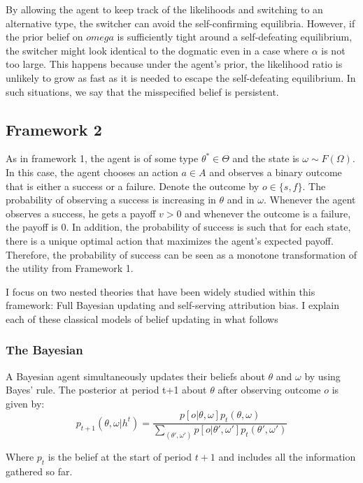 \documentclass[
  12pt,
]{article}
\begin{document}
By allowing the agent to keep track of the likelihoods and switching to
an alternative type, the switcher can avoid the self-confirming
equilibria. However, if the prior belief on \(omega\) is sufficiently
tight around a self-defeating equilibrium, the switcher might look
identical to the dogmatic even in a case where \(\alpha\) is not too
large. This happens because under the agent's prior, the likelihood
ratio is unlikely to grow as fast as it is needed to escape the
self-defeating equilibrium. In such situations, we say that the
misspecified belief is persistent.

\hypertarget{framework-2}{%
\subsection{Framework 2}\label{framework-2}}

As in framework 1, the agent is of some type \(\theta^* \in \Theta\) and
the state is \(\omega \sim F(\Omega)\). In this case, the agent chooses
an action \(a\in A\) and observes a binary outcome that is either a
success or a failure. Denote the outcome by \(o \in \{s,f\}\). The
probability of observing a success is increasing in \(\theta\) and in
\(\omega\). Whenever the agent observes a success, he gets a payoff
\(v>0\) and whenever the outcome is a failure, the payoff is 0. In
addition, the probability of success is such that for each state, there
is a unique optimal action that maximizes the agent's expected payoff.
Therefore, the probability of success can be seen as a monotone
transformation of the utility from Framework 1.

I focus on two nested theories that have been widely studied within this
framework: Full Bayesian updating and self-serving attribution bias. I
explain each of these classical models of belief updating in what
follows

\hypertarget{the-bayesian}{%
\subsubsection{The Bayesian}\label{the-bayesian}}

A Bayesian agent simultaneously updates their beliefs about \(\theta\)
and \(\omega\) by using Bayes' rule. The posterior at period t+1 about
\(\theta\) after observing outcome \(o\) is given by: \[
p_{t+1}(\theta, \omega| h^t) = \frac{p[o|\theta, \omega]p_t(\theta, \omega)}{\sum_{(\theta', \omega')}p[o|\theta', \omega']p_t(\theta', \omega')}
\]

Where \(p_{t}\) is the belief at the start of period \(t+1\) and
includes all the information gathered so far.
\end{document}
